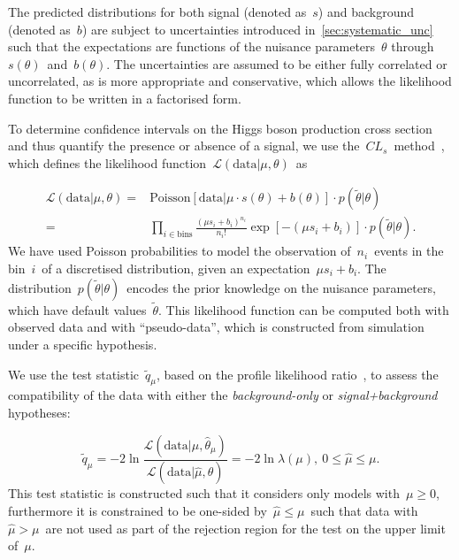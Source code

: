 The predicted distributions for both signal (denoted as~$s$) and background (denoted as~$b$) are subject to uncertainties introduced in~\cref{sec:systematic_unc} such that the expectations are functions of the nuisance parameters~$\theta$ through~$s(\theta)$~and~$b(\theta)$. The uncertainties are assumed to be either fully correlated or uncorrelated, as is more appropriate and conservative, which allows the likelihood function to be written in a factorised form.

To determine confidence intervals on the Higgs boson production cross section and thus quantify the presence or absence of a signal, we use the~$CL_s$~method~\cite{Junk:1999kv,Read:2002}, which defines the likelihood function~$\mathcal{L}(\mathrm{data} | \mu, \theta)$~as

\begin{align}
\label{eq:likelihood}
\mathcal{L}(\mathrm{data} | \mu, \theta) =&  \mathrm{Poisson}[\mathrm{data} | \mu \cdot s(\theta) + b(\theta)] \cdot p(\tilde{\theta} | \theta)\\
=& \prod_{i\in \mathrm{bins}} \frac{(\mu s_i + b_i)^{n_i}}{n_i!} \exp{[-(\mu s_i + b_i)]} \cdot p(\tilde{\theta} | \theta).
\end{align}
We have used Poisson probabilities to model the observation of~$n_i$~events in the bin~$i$~of a discretised distribution, given an expectation~$\mu s_i + b_i$. The distribution~$p(\tilde{\theta} | \theta)$~encodes the prior knowledge on the nuisance parameters, which have default values~$\tilde{\theta}$. This likelihood function can be computed both with observed data and with ``pseudo-data'', which is constructed from simulation under a specific hypothesis.

We use the test statistic~$\tilde{q}_\mu$, based on the profile likelihood ratio~\cite{Cowan:2010js}, to assess the compatibility of the data with either the \textit{background-only} or \textit{signal+background} hypotheses:

\begin{equation}
\tilde{q}_\mu = -2 \ln{\frac{\mathcal{L}(\mathrm{data} | \mu, \hat{\theta}_\mu)}{\mathcal{L}(\mathrm{data} | \hat{\mu}, \hat{\theta})}} = -2 \ln{\lambda(\mu)},\ 0 \le \hat{\mu} \le \mu.
\end{equation}
This test statistic is constructed such that it considers only models with~$\mu \ge 0$, furthermore it is constrained to be one-sided by~$\hat{\mu} \le \mu$~such that data with~$\hat{\mu} > \mu$~are not used as part of the rejection region for the test on the upper limit of~$\mu$.

